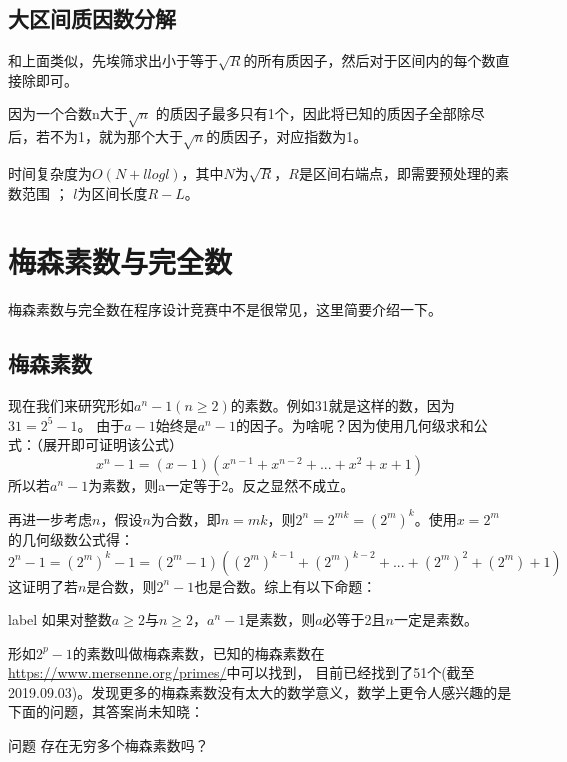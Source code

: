 

\subsection{大区间质因数分解}
和上面类似，先埃筛求出小于等于$\sqrt{R}$的所有质因子，然后对于区间内的每个数直接除即可。

因为一个合数n大于$\sqrt{n}$ 的质因子最多只有1个，因此将已知的质因子全部除尽后，若不为1，就为那个大于$\sqrt{n}$的质因子，对应指数为1。

时间复杂度为$O(N + llogl)$，其中$N$为$\sqrt{R}$，$R$是区间右端点，即需要预处理的素数范围 ； $l$为区间长度$R-L$。




\section{梅森素数与完全数}
梅森素数与完全数在程序设计竞赛中不是很常见，这里简要介绍一下。

\subsection{梅森素数}
现在我们来研究形如$a^n-1(n\ge2)$的素数。例如31就是这样的数，因为$31 = 2^5 - 1$。
由于$a-1$始终是$a^n-1$的因子。为啥呢？因为使用几何级求和公式：（展开即可证明该公式）
$$
x^n-1=(x-1)(x^{n-1}+x^{n-2}+...+x^2+x+1)
$$
所以若$a^n-1$为素数，则a一定等于2。反之显然不成立。

再进一步考虑$n$，假设$n$为合数，即$n=mk$，则$2^n=2^{mk}=(2^m)^k$。使用$x=2^m$的几何级数公式得：
$$
2^n - 1 = (2^m)^k - 1 = (2^m-1)((2^m)^{k-1}+(2^m)^{k-2}+...+(2^m)^2+(2^m)+1)
$$
这证明了若$n$是合数，则$2^n-1$也是合数。综上有以下命题：

\begin{proposition}{}{label}
	如果对整数$a\ge2$与$n\ge2$，$a^n-1$是素数，则$a$必等于2且$n$一定是素数。
\end{proposition}

形如$2^p-1$的素数叫做{\heiti 梅森素数}，已知的梅森素数在\href{https://www.mersenne.org/primes/}{https://www.mersenne.org/primes/}中可以找到，
目前已经找到了51个(截至2019.09.03)。发现更多的梅森素数没有太大的数学意义，数学上更令人感兴趣的是下面的问题，其答案尚未知晓：

\begin{custom}{问题}
	存在无穷多个梅森素数吗？
\end{custom}

